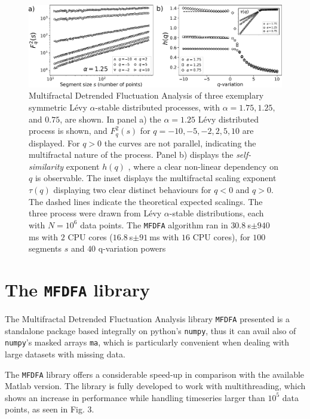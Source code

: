 \documentclass[pre, a4paper, aps, floatfix, superscriptaddress, onecolumn, notitlepage, longbibliography]{revtex4-1} %
\begin{document}
\begin{figure}[h]
  \includegraphics[width = 0.98\linewidth]{fig2.pdf}
  \caption{Multifractal Detrended Fluctuation Analysis of three exemplary symmetric Lévy $\alpha$-stable distributed processes, with $\alpha = 1.75, 1.25,$ and $0.75$, are shown.
  In panel a) the $\alpha = 1.25$ Lévy distributed process is shown, and $F_q^2(s)$ for $q = -10, -5, -2, 2, 5, 10$ are displayed.
  For $q>0$ the curves are not parallel, indicating the multifractal nature of the process.
  Panel b) displays the \textit{self-similarity} exponent $h(q)$ , where a clear non-linear dependency on $q$ is observable.
  The inset displays the multifractal scaling exponent $\tau(q)$ displaying two clear distinct behaviours for $q<0$ and $q>0$.
  The dashed lines indicate the theoretical expected scalings.
  The three process were drawn from Lévy $\alpha$-stable distributions, each with $N=10^6$ data points.
  The \texttt{MFDFA} algorithm ran in $30.8\!~$s$\pm 940\!~$ms with $2$ CPU cores ($16.8\!~$s$\pm 91\!~$ms with $16$ CPU cores), for $100$ segments $s$ and $40$ q-variation powers}
\end{figure}

\section{The \texttt{MFDFA} library}
The Multifractal Detrended Fluctuation Analysis library \texttt{MFDFA} presented is a standalone package based integrally on python's \texttt{numpy}, thus it can avail also of \texttt{numpy}'s masked arrays \texttt{ma}, which is particularly convenient when dealing with large datasets with missing data.

The \texttt{MFDFA} library offers a considerable speed-up in comparison with the available Matlab version.
The library is fully developed to work with multithreading, which shows an increase in performance while handling timeseries larger than $10^5$ data points, as seen in Fig. 3.
\end{document}
